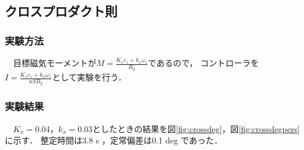\newpage

\subsection{クロスプロダクト則}
\subsubsection{実験方法}
　目標磁気モーメントが$M = \frac{K_x c_z + k_x \omega_z}{B_y}$であるので，
コントローラを$I=\frac{K_x c_z + k_x \omega_z}{nSB_y}$として実験を行う．

\subsubsection{実験結果}
　$K_x=0.04$，$k_x=0.03$としたときの結果を図\ref{fig:crossdeg}，図\ref{fig:crossdegpers}に示す．
整定時間は3.8 s ，定常偏差は0.1 deg であった．

